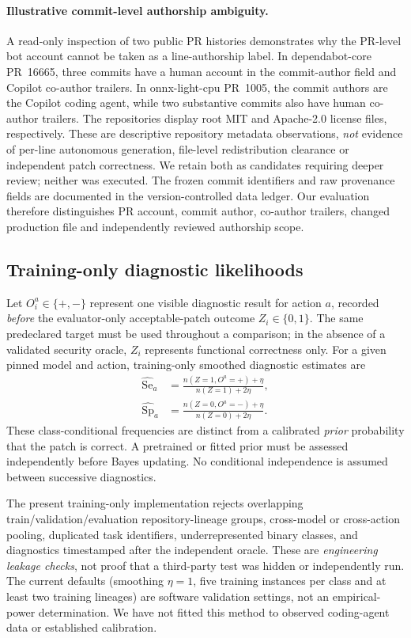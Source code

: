 \documentclass[pdflatex,sn-basic]{sn-jnl}
\begin{document}
\paragraph{Illustrative commit-level authorship ambiguity.}
A read-only inspection of two public PR histories demonstrates why
the PR-level bot account cannot be taken as a line-authorship label.
In dependabot-core PR~16665, three commits have a human account in
the commit-author field and Copilot co-author trailers. In
onnx-light-cpu PR~1005, the commit authors are the Copilot coding
agent, while two substantive commits also have human co-author trailers.
The repositories display root MIT and Apache-2.0 license files,
respectively. These are descriptive repository metadata observations,
\emph{not} evidence of per-line autonomous generation, file-level
redistribution clearance or independent patch correctness. We retain
both as candidates requiring deeper review; neither was executed.
The frozen commit identifiers and raw provenance fields are documented
in the version-controlled data ledger. Our evaluation therefore
distinguishes PR account, commit author, co-author trailers, changed
production file and independently reviewed authorship scope.

\subsection{Training-only diagnostic likelihoods}\label{sec:diag-fit}

Let $O_i^a\in\{+,-\}$ represent one visible diagnostic result for
action $a$, recorded \emph{before} the evaluator-only acceptable-patch
outcome $Z_i\in\{0,1\}$. The same predeclared target must be used
throughout a comparison; in the absence of a validated security oracle,
$Z_i$ represents functional correctness only. For a given pinned
model and action, training-only smoothed diagnostic estimates are
\begin{align}
\widehat{\mathrm{Se}}_a
&=\frac{n(Z=1,O^a=+)+\eta}{n(Z=1)+2\eta},
\label{eq:sensitivity}\\
\widehat{\mathrm{Sp}}_a
&=\frac{n(Z=0,O^a=-)+\eta}{n(Z=0)+2\eta}.
\label{eq:specificity}
\end{align}
These class-conditional frequencies are distinct from a calibrated
\emph{prior} probability that the patch is correct. A pretrained or
fitted prior must be assessed independently before Bayes updating.
No conditional independence is assumed between successive diagnostics.

The present training-only implementation rejects overlapping
train/validation/evaluation repository-lineage groups,
cross-model or cross-action pooling, duplicated task identifiers,
underrepresented binary classes, and diagnostics timestamped after
the independent oracle. These are \emph{engineering leakage checks},
not proof that a third-party test was hidden or independently run.
The current defaults (smoothing $\eta=1$, five training instances per
class and at least two training lineages) are software validation
settings, not an empirical-power determination. We have not fitted
this method to observed coding-agent data or established calibration.
\end{document}

